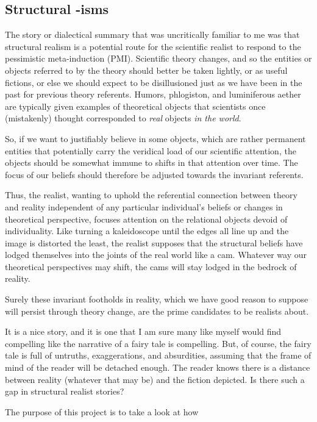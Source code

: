 \subsection{Structural -isms}


The story or dialectical summary that was uncritically familiar to me was that structural realism is a potential route for the scientific realist to respond to the pessimistic meta-induction (PMI).  Scientific theory changes, and so the entities or objects referred to by the theory should better be taken lightly, or as useful fictions, or else we should expect to be disillusioned just as we have been in the past for previous theory referents.  Humors, phlogiston, and luminiferous aether are typically given examples of theoretical objects that scientists once (mistakenly) thought corresponded to \emph{real} objects \emph{in the world}.

So, if we want to justifiably believe in some objects, which are rather permanent entities that potentially carry the veridical load of our scientific attention, the objects should be somewhat immune to shifts in that attention over time.  The focus of our beliefs should therefore be adjusted towards the invariant referents.

Thus, the realist, wanting to uphold the referential connection between theory and reality independent of any particular individual's beliefs or changes in theoretical perspective, focuses attention on the relational objects devoid of individuality.  Like turning a kaleidoscope until the edges all line up and the image is distorted the least, the realist supposes that the structural beliefs have lodged themselves into the joints of the real world like a cam.  Whatever way our theoretical perspectives may shift, the cams will stay lodged in the bedrock of reality.

Surely these invariant footholds in reality, which we have good reason to suppose will persist through theory change, are the prime candidates to be realists about.

It is a nice story, and it is one that I am sure many like myself would find compelling like the narrative of a fairy tale is compelling.  But, of course, the fairy tale is full of untruths, exaggerations, and absurdities, assuming that the frame of mind of the reader will be detached enough.  The reader knows there is a distance between reality (whatever that may be) and the fiction depicted.  Is there such a gap in structural realist stories?

The purpose of this project is to take a look at how 


